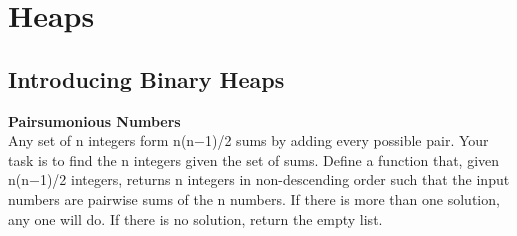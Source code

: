 
\chapter{Heaps}


\section{Introducing Binary Heaps}


\begin{example}

\textbf{Pairsumonious Numbers} \\
Any set of n integers form n(n−1)/2 sums by adding every possible pair. Your task is to ﬁnd the
n integers given the set of sums. Deﬁne a function that, given n(n−1)/2 integers, 
returns n integers in non-descending order such that the input numbers are pairwise sums 
of the n numbers. If there is more than one solution, 
any one will do. If there is no solution, return the empty list.

\end{example}
